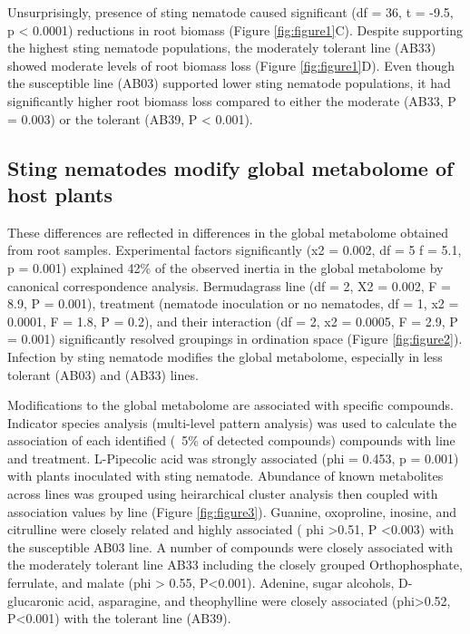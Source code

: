 \documentclass[9pt,lineno]{elife}
\begin{document}
Unsurprisingly, presence of sting nematode caused significant (df = 36, t = -9.5, p < 0.0001) reductions in root biomass (Figure \ref{fig:figure1}C).  Despite supporting the highest sting nematode populations, the moderately tolerant line (AB33) showed moderate levels of root biomass loss (Figure \ref{fig:figure1}D). Even though the susceptible line (AB03) supported lower sting nematode populations, it had significantly higher root biomass loss compared to either the moderate (AB33, P = 0.003) or the tolerant (AB39, P < 0.001).  

\subsection{Sting nematodes modify global metabolome of host plants}
These differences are reflected in differences in the global metabolome obtained from root samples.  Experimental factors significantly (x2 = 0.002, df = 5 f = 5.1, p = 0.001) explained 42\% of the observed inertia in the global metabolome by canonical correspondence analysis.  Bermudagrass line (df = 2, X2 = 0.002, F = 8.9, P = 0.001), treatment (nematode inoculation or no nematodes, df = 1, x2 = 0.0001, F = 1.8, P = 0.2), and their interaction (df = 2, x2 = 0.0005, F = 2.9, P = 0.001) significantly resolved groupings in ordination space (Figure \ref{fig:figure2}).  Infection by sting nematode modifies the global metabolome, especially in less tolerant (AB03) and (AB33) lines.

Modifications to the global metabolome are associated with specific compounds.  Indicator species analysis (multi-level pattern analysis) was used to calculate the association of each identified (~5\% of detected compounds) compounds with line and treatment.  L-Pipecolic acid was strongly associated (phi = 0.453, p = 0.001) with plants inoculated with sting nematode.  Abundance of known metabolites across lines was grouped using heirarchical cluster analysis then coupled with association values by line (Figure \ref{fig:figure3}).  Guanine, oxoproline, inosine, and citrulline were closely related and highly associated ( phi >0.51, P <0.003) with the susceptible AB03 line.  A number of compounds were closely associated with the moderately tolerant line AB33 including the closely grouped Orthophosphate, ferrulate, and malate (phi > 0.55, P<0.001). Adenine, sugar alcohols, D-glucaronic acid, asparagine, and theophylline were closely associated (phi>0.52, P<0.001) with the tolerant line (AB39).  
\end{document}
